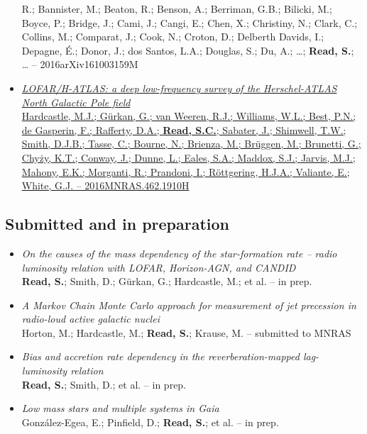 \documentclass[letterpaper]{twentysecondcv} %
\begin{document}
\begin{finalpages}
\begin{itemize}
{{R.; Bannister, M.; Beaton, R.; Benson, A.; Berriman, G.B.; Bilicki, M.;
Boyce, P.; Bridge, J.; Cami, J.; Cangi, E.; Chen, X.; Christiny, N.;
Clark, C.; Collins, M.; Comparat, J.; Cook, N.; Croton, D.; Delberth
Davids, I.; Depagne, É.; Donor, J.; dos Santos, L.A.; Douglas, S.; Du,
A.; \ldots; \textbf{Read, S.}; \ldots{} -- 2016arXiv161003159M}}
 \item \href{http://shaun.science/publication/2016-10-00-LOFAR-H-ATLAS}{\textit{LOFAR/H-ATLAS: a deep low-frequency survey of the Herschel-ATLAS North
Galactic Pole field}\\{\small Hardcastle, M.J.; Gürkan, G.; van Weeren, R.J.; Williams, W.L.; Best,
P.N.; de Gasperin, F.; Rafferty, D.A.; \textbf{Read, S.C.}; Sabater, J.;
Shimwell, T.W.; Smith, D.J.B.; Tasse, C.; Bourne, N.; Brienza, M.;
Brüggen, M.; Brunetti, G.; Chyży, K.T.; Conway, J.; Dunne, L.; Eales,
S.A.; Maddox, S.J.; Jarvis, M.J.; Mahony, E.K.; Morganti, R.; Prandoni,
I.; Röttgering, H.J.A.; Valiante, E.; White, G.J. -- 2016MNRAS.462.1910H}}
\end{itemize}

\subsection{Submitted and in preparation}
\begin{itemize}
     \item \textit{On the causes of the mass dependency of the star-formation rate -- radio
luminosity relation with LOFAR, Horizon-AGN, and CANDID}\\{\small \textbf{Read, S.}; Smith, D.; Gürkan, G.; Hardcastle, M.; et al. -- in prep.}
 \item \textit{A Markov Chain Monte Carlo approach for measurement of jet precession in
radio-loud active galactic nuclei}\\{\small Horton, M.; Hardcastle, M.; \textbf{Read, S.}; Krause, M. -- submitted to MNRAS}
 \item \textit{Bias and accretion rate dependency in the reverberation-mapped
lag-luminosity relation}\\{\small \textbf{Read, S.}; Smith, D.; et al. -- in prep.}
 \item \textit{Low mass stars and multiple systems in Gaia}\\{\small González-Egea, E.; Pinfield, D.; \textbf{Read, S.}; et al. -- in prep.}
\end{itemize}
\end{finalpages}
\end{document}
